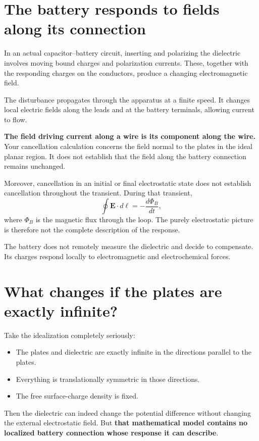 \documentclass[11pt,letterpaper]{article}
\begin{document}
\section{The battery responds to fields along its connection}

In an actual capacitor--battery circuit, inserting and polarizing the dielectric
involves moving bound charges and polarization currents. These, together with
the responding charges on the conductors, produce a changing electromagnetic
field.

The disturbance propagates through the apparatus at a finite speed. It changes
local electric fields along the leads and at the battery terminals, allowing
current to flow.

\textbf{The field driving current along a wire is its component along the wire.}
Your cancellation calculation concerns the field normal to the plates in the
ideal planar region. It does not establish that the field along the battery
connection remains unchanged.

Moreover, cancellation in an initial or final electrostatic state does not
establish cancellation throughout the transient. During that transient,
\[
    \oint\mathbf{E}\cdot d\boldsymbol{\ell}
    =-\frac{d\Phi_B}{dt},
\]
where $\Phi_B$ is the magnetic flux through the loop. The purely electrostatic
picture is therefore not the complete description of the response.

The battery does not remotely measure the dielectric and decide to compensate.
Its charges respond locally to electromagnetic and electrochemical forces.

\section{What changes if the plates are exactly infinite?}

Take the idealization completely seriously:
\begin{itemize}
    \item The plates and dielectric are exactly infinite in the directions
          parallel to the plates.
    \item Everything is translationally symmetric in those directions.
    \item The free surface-charge density is fixed.
\end{itemize}
Then the dielectric can indeed change the potential difference without changing
the external electrostatic field. But \textbf{that mathematical model contains
no localized battery connection whose response it can describe}.
\end{document}
